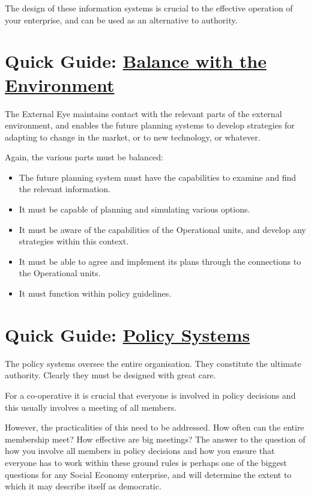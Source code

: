 The design of these information systems is crucial to the effective operation of your enterprise, and can be used as an alternative to authority.

\section*{Quick Guide: \href{https://vsmg.lrc.org.uk/7envtbal.html}{Balance with the Environment}}
The External Eye maintains contact with the relevant parts of the external environment, and enables the future planning systems to develop strategies for adapting to change in the market, or to new technology, or whatever.

Again, the various parts must be balanced:

\begin{itemize}
  \item The future planning system must have the capabilities to examine and find the relevant information.

  \item It must be capable of planning and simulating various options.

  \item It must be aware of the capabilities of the Operational units, and develop any strategies within this context.

  \item It must be able to agree and implement its plans through the connections to the Operational units.

  \item It must function within policy guidelines.

\end{itemize}

\section*{Quick Guide: \href{https://vsmg.lrc.org.uk/8psysdes.html}{Policy Systems}}
The policy systems oversee the entire organisation. They constitute the ultimate authority. Clearly they must be designed with great care.

For a co-operative it is crucial that everyone is involved in policy decisions and this usually involves a meeting of all members.

However, the practicalities of this need to be addressed. How often can the entire membership meet? How effective are big meetings? The answer to the question of how you involve all members in policy decisions and how you ensure that everyone has to work within these ground rules is perhaps one of the biggest questions for any Social Economy enterprise, and will determine the extent to which it may describe itself as democratic.

